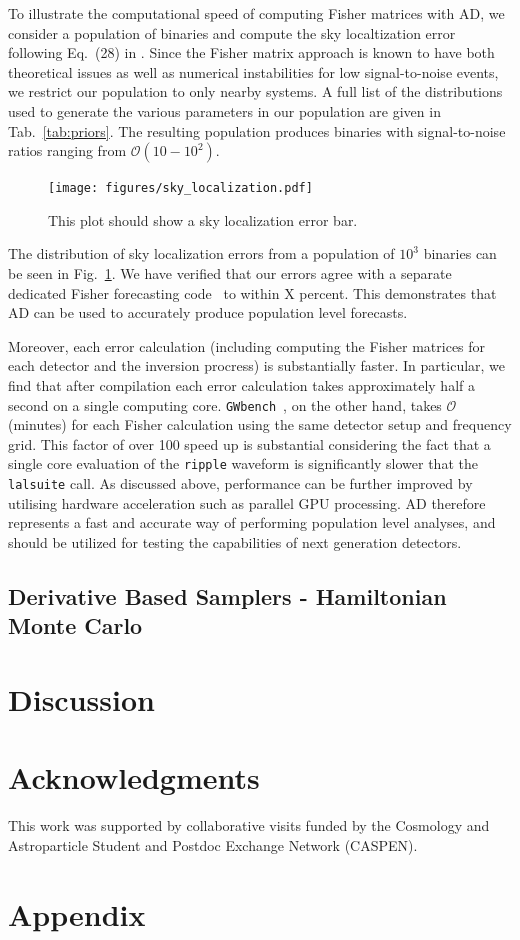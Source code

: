 \documentclass[twocolumn]{aastex631}
\newcommand{\ripple}{\texttt{ripple}\xspace}
\newcommand{\lalsuite}{\texttt{lalsuite}\xspace}
\begin{document}
To illustrate the computational speed of computing Fisher matrices with AD, we consider a population of binaries and compute the sky localtization error following Eq.~(28) in \citep{Iacovelli:2022bbs, Iacovelli:2022mbg}.
Since the Fisher matrix approach is known to have both theoretical issues as well as numerical instabilities for low signal-to-noise events, we restrict our population to only nearby systems.
A full list of the distributions used to generate the various parameters in our population are given in Tab.~\ref{tab:priors}.
The resulting population produces binaries with signal-to-noise ratios ranging from $\mathcal{O}(10-10^2)$.

\begin{figure}[ht!]
    \begin{centering}
        \texttt{[image: figures/sky\_localization.pdf]}
        \caption{
            This plot should show a sky localization error bar.
        }
        \label{fig:sky_localization}
    \end{centering}
\end{figure}

The distribution of sky localization errors from a population of $10^3$ binaries can be seen in Fig.~\ref{fig:sky_localization}.
We have verified that our errors agree with a separate dedicated Fisher forecasting code~\citep{Borhanian:2020ypi} to within X percent.
This demonstrates that AD can be used to accurately produce population level forecasts.

Moreover, each error calculation (including computing the Fisher matrices for each detector and the inversion procress) is substantially faster.
In particular, we find that after compilation each error calculation takes approximately half a second on a single computing core.
\texttt{GWbench}~\citep{Borhanian:2020ypi}, on the other hand, takes $\mathcal{O}$(minutes) for each Fisher calculation using the same detector setup and frequency grid.
This factor of over 100 speed up is substantial considering the fact that a single core evaluation of the \ripple waveform is significantly slower that the \lalsuite call.
As discussed above, performance can be further improved by utilising hardware acceleration such as parallel GPU processing.
AD therefore represents a fast and accurate way of performing population level analyses, and should be utilized for testing the capabilities of next generation detectors.

\subsection{Derivative Based Samplers - Hamiltonian Monte Carlo}
\label{subsec:hmc}

\section{Discussion}
\label{subsec:discussion}

\section{Acknowledgments}
This work was supported by collaborative visits funded by the Cosmology and Astroparticle Student and Postdoc Exchange Network (CASPEN).



\section{Appendix}
\label{sec:appendix}
\end{document}
